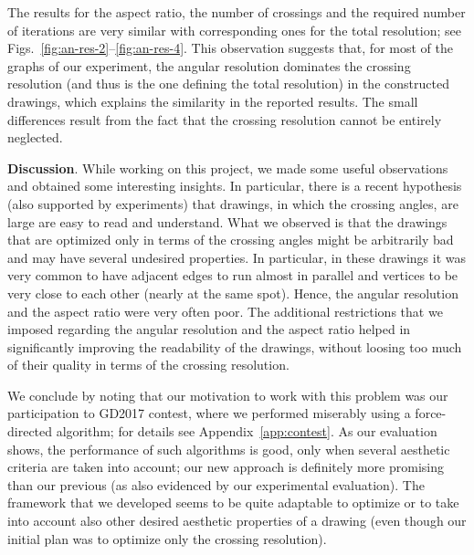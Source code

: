 \documentclass[runningheads]{llncs}
\newcommand{\myparagraph}[1]{\smallskip\noindent\textbf{#1}.}
\begin{document}
The results for the aspect ratio, the number of crossings and the required number of iterations are very similar with corresponding ones for the total resolution; see Figs.~\ref{fig:an-res-2}--\ref{fig:an-res-4}. This observation suggests that, for most of the graphs of our experiment, the angular resolution dominates the crossing resolution (and thus is the one defining the total resolution) in the constructed drawings, which explains the similarity in the reported results. The small differences result from the fact that the crossing resolution cannot be entirely neglected.

\myparagraph{Discussion}
%
%
%
While working on this project, we made some useful observations and  obtained some interesting insights. In particular, there is a recent hypothesis (also supported by experiments) that drawings, in which the crossing angles, are large are easy to read and understand. What we observed is that the drawings that are optimized only in terms of the crossing angles might be arbitrarily bad and may have several undesired properties. In particular, in these drawings it was very common to have adjacent edges to run almost in parallel and vertices to be very close to each other (nearly at the same spot). Hence, the angular resolution and the aspect ratio were very often poor. The additional restrictions that we imposed regarding the angular resolution and the aspect ratio helped in significantly improving the readability of the drawings, without loosing too much of their quality in terms of the crossing resolution.

We conclude by noting that our motivation to work with this problem was our participation to GD2017 contest, where we performed miserably using a force-directed algorithm; for details see Appendix~\ref{app:contest}. As our evaluation shows, the performance of such algorithms is good, only when several aesthetic criteria are taken into account; our new approach is definitely more promising than our previous (as also evidenced by our experimental evaluation). The framework that we developed seems to be quite adaptable to optimize or to take into account also other desired aesthetic properties of a drawing (even though our initial plan was to optimize only the crossing resolution).
\end{document}
